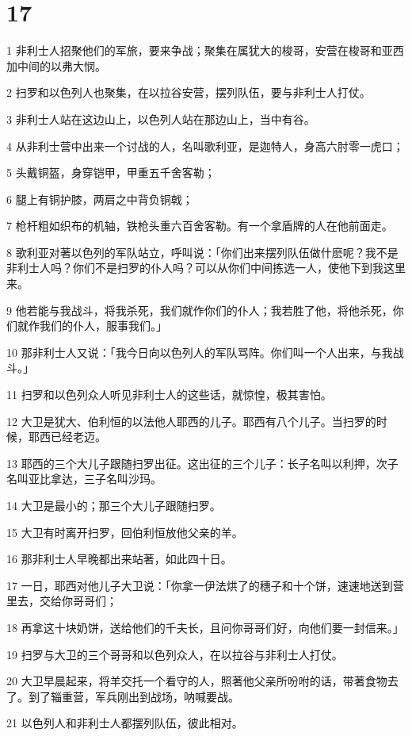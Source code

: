 \chapter{17}

\par 1 非利士人招聚他们的军旅，要来争战；聚集在属犹大的梭哥，安营在梭哥和亚西加中间的以弗大悯。
\par 2 扫罗和以色列人也聚集，在以拉谷安营，摆列队伍，要与非利士人打仗。
\par 3 非利士人站在这边山上，以色列人站在那边山上，当中有谷。
\par 4 从非利士营中出来一个讨战的人，名叫歌利亚，是迦特人，身高六肘零一虎口；
\par 5 头戴铜盔，身穿铠甲，甲重五千舍客勒；
\par 6 腿上有铜护膝，两肩之中背负铜戟；
\par 7 枪杆粗如织布的机轴，铁枪头重六百舍客勒。有一个拿盾牌的人在他前面走。
\par 8 歌利亚对著以色列的军队站立，呼叫说：「你们出来摆列队伍做什麽呢？我不是非利士人吗？你们不是扫罗的仆人吗？可以从你们中间拣选一人，使他下到我这里来。
\par 9 他若能与我战斗，将我杀死，我们就作你们的仆人；我若胜了他，将他杀死，你们就作我们的仆人，服事我们。」
\par 10 那非利士人又说：「我今日向以色列人的军队骂阵。你们叫一个人出来，与我战斗。」
\par 11 扫罗和以色列众人听见非利士人的这些话，就惊惶，极其害怕。
\par 12 大卫是犹大、伯利恒的以法他人耶西的儿子。耶西有八个儿子。当扫罗的时候，耶西已经老迈。
\par 13 耶西的三个大儿子跟随扫罗出征。这出征的三个儿子：长子名叫以利押，次子名叫亚比拿达，三子名叫沙玛。
\par 14 大卫是最小的；那三个大儿子跟随扫罗。
\par 15 大卫有时离开扫罗，回伯利恒放他父亲的羊。
\par 16 那非利士人早晚都出来站著，如此四十日。
\par 17 一日，耶西对他儿子大卫说：「你拿一伊法烘了的穗子和十个饼，速速地送到营里去，交给你哥哥们；
\par 18 再拿这十块奶饼，送给他们的千夫长，且问你哥哥们好，向他们要一封信来。」
\par 19 扫罗与大卫的三个哥哥和以色列众人，在以拉谷与非利士人打仗。
\par 20 大卫早晨起来，将羊交托一个看守的人，照著他父亲所吩咐的话，带著食物去了。到了辎重营，军兵刚出到战场，呐喊要战。
\par 21 以色列人和非利士人都摆列队伍，彼此相对。
